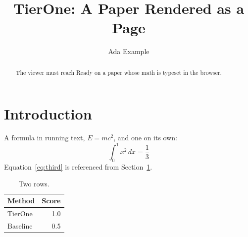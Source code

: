 \documentclass[sigconf]{acmart}
\newcommand{\ours}{TierOne}
\begin{document}
\title{\ours{}: A Paper Rendered as a Page}
\author{Ada Example}
\begin{abstract}
The viewer must reach Ready on a paper whose math is typeset in the browser.
\end{abstract}
\maketitle

\section{Introduction}
\label{sec:intro}
A formula in running text, $E = mc^2$, and one on its own:
\begin{equation}
  \int_0^1 x^2 \, dx = \frac{1}{3}
  \label{eq:third}
\end{equation}
Equation~\eqref{eq:third} is referenced from Section~\ref{sec:intro}.

\begin{table}
  \caption{Two rows.}
  \begin{tabular}{lr}
    \toprule
    Method & Score \\
    \midrule
    \ours{} & 1.0 \\
    Baseline & 0.5 \\
    \bottomrule
  \end{tabular}
\end{table}
\end{document}
